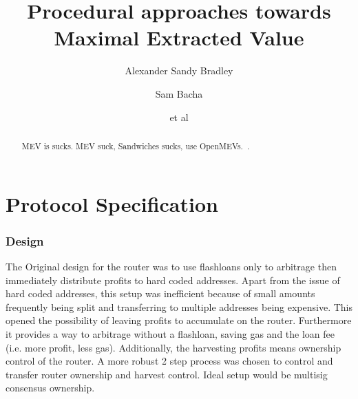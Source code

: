 \documentclass[runningheads]{llncs}
\begin{document}
%
\title{Procedural approaches towards Maximal Extracted Value}
%
\author{Alexander Sandy Bradley \and
	Sam Bacha \and
	et al}
%
%


%
\maketitle              %


\tableofcontents

\newpage
\chapter{Protocol Specification}
\begin{abstract}
	MEV is sucks. \newline
	MEV suck, Sandwiches sucks, use OpenMEVs.~\cite{openmev}.
\end{abstract}

\subsection{Design}
The Original design for the router was to use flashloans only to arbitrage then immediately distribute profits to hard coded addresses. Apart from the issue of hard coded addresses, this setup was inefficient because of small amounts frequently being split and transferring to multiple addresses being expensive. This opened the possibility of leaving profits to accumulate on the router. Furthermore it provides a way to arbitrage without a flashloan, saving gas and the loan fee (i.e. more profit, less gas). Additionally, the harvesting profits means ownership control of the router. A more robust 2 step process was chosen to control and transfer router ownership and harvest control. Ideal setup would be multisig consensus ownership.
\end{document}
